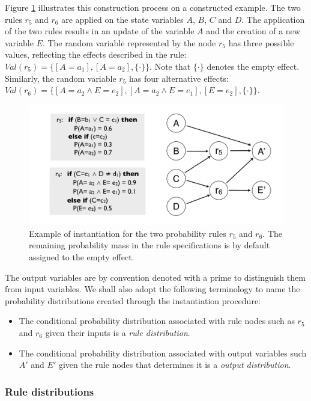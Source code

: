 Figure \ref{fig:instantiationprob} illustrates this construction process on a constructed example.  The two rules $r_5$ and $r_6$ are applied on the state variables $A$, $B$, $C$ and $D$.  The application of the two rules results in an update of the variable $A$ and the creation of a new variable $E$. The random variable represented by the node $r_5$ has three possible values, reflecting the effects described in the rule: $Val(r_5) = \{ [A\!=\!a_1], [A\!=\!a_2], \{\cdot\}\}$.  Note that $\{\cdot\}$ denotes the empty effect.  Similarly, the random variable $r_5$ has four alternative effects: $Val(r_6) = \{[A\!=\!a_2 \land E\!=\!e_2], [A\!=\!a_2 \land E\!=\!e_1], [E=e_2], \{\cdot\}\}$. 

\begin{figure}[h]
\centering
\includegraphics[scale=0.25]{imgs/ruleinstantiation.pdf}
\caption{Example of instantiation for the two probability rules $r_5$ and $r_6$. The remaining probability mass in the rule specifications is by default assigned to the empty effect. }
\label{fig:instantiationprob}
\end{figure}

The output variables are by convention denoted with a prime to distinguish them from input variables.  We shall also adopt the following terminology to name the probability distributions created through the instantiation procedure: 
\begin{itemize}
\item The conditional probability distribution associated with rule nodes such as $r_5$ and $r_6$ given their inputs is a \textit{rule distribution}.
\item The conditional probability distribution associated with output variables such $A'$ and $E'$ given the rule nodes that determines it is a \textit{output distribution}.
\end{itemize}

\subsubsection*{Rule distributions}

